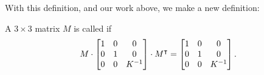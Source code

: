 \documentclass{ximera}
\begin{document}
With this definition, and our work above, we make a new definition:


\begin{definition}
A $3\times3$ matrix $M$ is called  if
\[
M\cdot\begin{bmatrix}
1 & 0 & 0\\
0 & 1 & 0\\
0 & 0 & K^{-1}%
\end{bmatrix}  \cdot M^\transpose=\begin{bmatrix}
1 & 0 & 0\\
0 & 1 & 0\\
0 & 0 & K^{-1}%
\end{bmatrix}.
\]
\end{definition}
\end{document}
